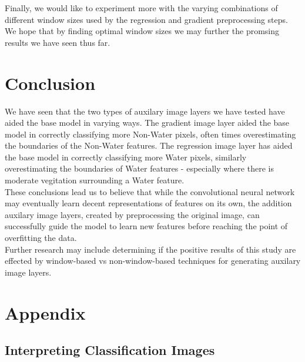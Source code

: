 \documentclass[12pt]{article}
\begin{document}
Finally, we would like to experiment more with the varying combinations of different window sizes used by the regression and gradient preprocessing steps. We hope that by finding optimal window sizes we may further the promsing results we have seen thus far. 

\section{Conclusion}

We have seen that the two types of auxilary image layers we have tested have aided the base model in varying ways. The gradient image layer aided the base model in correctly classifying more Non-Water pixels, often times overestimating the boundaries of the Non-Water features. The regression image layer has aided the base model in correctly classifying more Water pixels, similarly overestimating the boundaries of Water features - especially where there is moderate vegitation surrounding a Water feature.
\\

These conclusions lead us to believe that while the convolutional neural network may eventually learn decent representations of features on its own, the addition auxilary image layers, created by preprocessing the original image, can successfully guide the model to learn new features before reaching the point of overfitting the data.
\\

Further research may include determining if the positive results of this study are effected by window-based vs non-window-based techniques for generating auxilary image layers.


\newpage
\section{Appendix}

\subsection{Interpreting Classification Images}
\begin{figure}[!htb]
\end{figure}
\end{document}
